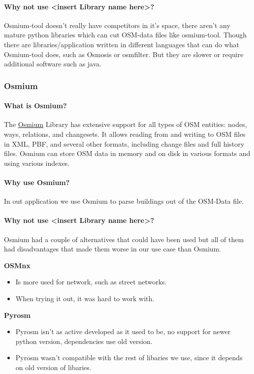 \documentclass[parskip=full]{scrartcl} %
\begin{document}
\paragraph{Why not use <insert Library name here>?}
Osmium-tool doesn't really have competitors in it's space, there aren't any mature python libraries which can cut OSM-data files like osmium-tool.
Though there are libraries/application written in different languages that can do what Osmium-tool does, such as Osmosis or osmfilter.
But they are slower or require additional software such as java.


\subsubsection{Osmium}

\paragraph{What is Osmium?}
The \href{https://osmcode.org/libosmium/}{Osmium} Library has extensive support for all types of OSM entities: nodes, ways, relations, and changesets. It allows reading from and writing to OSM files in XML, PBF, and several other formats, including change files and full history files. Osmium can store OSM data in memory and on disk in various formats and using various indexes.

\paragraph{Why use Osmium?}
In out application we use Osmium to parse buildings out of the OSM-Data file.

\paragraph{Why not use <insert Library name here>?}
Osmium had a couple of alternatives that could have been used but all of them had disadvantages that made them worse in our use case than Osmium. 
  
\textbf{OSMnx}
\begin{itemize}
    \item Is more used for network, such as street networks. 
    \item When trying it out, it was hard to work with.
\end{itemize}


\textbf{Pyrosm}
\begin{itemize}
    \item Pyrosm isn't as active developed as it used to be, no support for newer python version, dependencies use old version.
    \item Pyrosm wasn't compatible with the rest of libaries we use, since it depends on old version of libaries.
\end{itemize}
\end{document}
